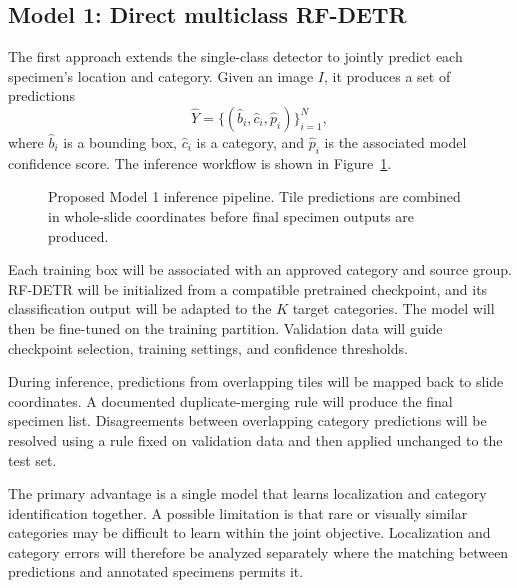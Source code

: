 \documentclass[11pt,letterpaper]{article}
\begin{document}
\subsection{Model 1: Direct multiclass RF-DETR}
The first approach extends the single-class detector to jointly predict each specimen's location and category. Given an image $I$, it produces a set of predictions
\[
\widehat{Y}=\{(\widehat{b}_i,\widehat{c}_i,\widehat{p}_i)\}_{i=1}^{N},
\]
where $\widehat{b}_i$ is a bounding box, $\widehat{c}_i$ is a category, and $\widehat{p}_i$ is the associated model confidence score. The inference workflow is shown in Figure~\ref{fig:model1}.

\begin{figure}[htbp]
\centering
{}
\caption{Proposed Model 1 inference pipeline. Tile predictions are combined in whole-slide coordinates before final specimen outputs are produced.}
\label{fig:model1}
\end{figure}

Each training box will be associated with an approved category and source group. RF-DETR will be initialized from a compatible pretrained checkpoint, and its classification output will be adapted to the $K$ target categories. The model will then be fine-tuned on the training partition. Validation data will guide checkpoint selection, training settings, and confidence thresholds.

During inference, predictions from overlapping tiles will be mapped back to slide coordinates. A documented duplicate-merging rule will produce the final specimen list. Disagreements between overlapping category predictions will be resolved using a rule fixed on validation data and then applied unchanged to the test set.

The primary advantage is a single model that learns localization and category identification together. A possible limitation is that rare or visually similar categories may be difficult to learn within the joint objective. Localization and category errors will therefore be analyzed separately where the matching between predictions and annotated specimens permits it.
\end{document}
